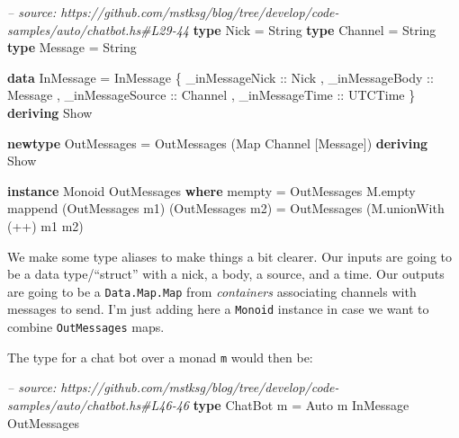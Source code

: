 \documentclass[]{article}
\newenvironment{Shaded}{}{}
\newcommand{\KeywordTok}[1]{\textcolor[rgb]{0.00,0.44,0.13}{\textbf{{#1}}}}
\newcommand{\DataTypeTok}[1]{\textcolor[rgb]{0.56,0.13,0.00}{{#1}}}
\newcommand{\CommentTok}[1]{\textcolor[rgb]{0.38,0.63,0.69}{\textit{{#1}}}}
\newcommand{\OtherTok}[1]{\textcolor[rgb]{0.00,0.44,0.13}{{#1}}}
\newcommand{\FunctionTok}[1]{\textcolor[rgb]{0.02,0.16,0.49}{{#1}}}
\newcommand{\NormalTok}[1]{{#1}}
\begin{document}
\begin{Shaded}
\begin{Highlighting}[]
\CommentTok{-- source: https://github.com/mstksg/blog/tree/develop/code-samples/auto/chatbot.hs#L29-44}
\KeywordTok{type} \DataTypeTok{Nick}    \FunctionTok{=} \DataTypeTok{String}
\KeywordTok{type} \DataTypeTok{Channel} \FunctionTok{=} \DataTypeTok{String}
\KeywordTok{type} \DataTypeTok{Message} \FunctionTok{=} \DataTypeTok{String}

\KeywordTok{data} \DataTypeTok{InMessage} \FunctionTok{=} \DataTypeTok{InMessage} \NormalTok{\{}\OtherTok{ _inMessageNick   ::} \DataTypeTok{Nick}
                           \NormalTok{,}\OtherTok{ _inMessageBody   ::} \DataTypeTok{Message}
                           \NormalTok{,}\OtherTok{ _inMessageSource ::} \DataTypeTok{Channel}
                           \NormalTok{,}\OtherTok{ _inMessageTime   ::} \DataTypeTok{UTCTime}
                           \NormalTok{\} }\KeywordTok{deriving} \DataTypeTok{Show}

\KeywordTok{newtype} \DataTypeTok{OutMessages} \FunctionTok{=} \DataTypeTok{OutMessages} \NormalTok{(}\DataTypeTok{Map} \DataTypeTok{Channel} \NormalTok{[}\DataTypeTok{Message}\NormalTok{]) }\KeywordTok{deriving} \DataTypeTok{Show}

\KeywordTok{instance} \DataTypeTok{Monoid} \DataTypeTok{OutMessages} \KeywordTok{where}
    \NormalTok{mempty  }\FunctionTok{=} \DataTypeTok{OutMessages} \NormalTok{M.empty}
    \NormalTok{mappend (}\DataTypeTok{OutMessages} \NormalTok{m1) (}\DataTypeTok{OutMessages} \NormalTok{m2)}
            \FunctionTok{=} \DataTypeTok{OutMessages} \NormalTok{(M.unionWith (}\FunctionTok{++}\NormalTok{) m1 m2)}
\end{Highlighting}
\end{Shaded}

We make some type aliases to make things a bit clearer. Our inputs are going to
be a data type/``struct'' with a nick, a body, a source, and a time. Our outputs
are going to be a \texttt{Data.Map.Map} from \emph{containers} associating
channels with messages to send. I'm just adding here a \texttt{Monoid} instance
in case we want to combine \texttt{OutMessages} maps.

The type for a chat bot over a monad \texttt{m} would then be:

\begin{Shaded}
\begin{Highlighting}[]
\CommentTok{-- source: https://github.com/mstksg/blog/tree/develop/code-samples/auto/chatbot.hs#L46-46}
\KeywordTok{type} \DataTypeTok{ChatBot} \NormalTok{m }\FunctionTok{=} \DataTypeTok{Auto} \NormalTok{m }\DataTypeTok{InMessage} \DataTypeTok{OutMessages}
\end{Highlighting}
\end{Shaded}
\end{document}
